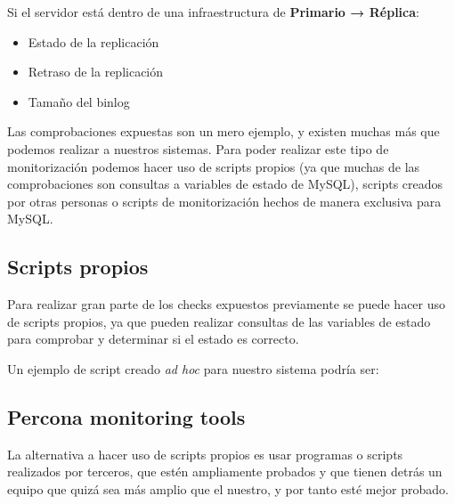 Si el servidor está dentro de una infraestructura de \textbf{Primario → Réplica}:
\begin{itemize}
    \item Estado de la replicación
    \item Retraso de la replicación
    \item Tamaño del binlog
\end{itemize}

Las comprobaciones expuestas son un mero ejemplo, y existen muchas más que podemos realizar a nuestros sistemas. Para poder realizar este tipo de monitorización podemos hacer uso de scripts propios (ya que muchas de las comprobaciones son consultas a variables de estado de MySQL), scripts creados por otras personas o scripts de monitorización hechos de manera exclusiva para MySQL.

\subsection{Scripts propios}
Para realizar gran parte de los checks expuestos previamente se puede hacer uso de scripts propios, ya que pueden realizar consultas de las variables de estado para comprobar y determinar si el estado es correcto.

Un ejemplo de script creado \textit{ad hoc} para nuestro sistema podría ser:


\subsection{Percona monitoring tools}
La alternativa a hacer uso de scripts propios es usar programas o scripts realizados por terceros, que estén ampliamente probados y que tienen detrás un equipo que quizá sea más amplio que el nuestro, y por tanto esté mejor probado.


